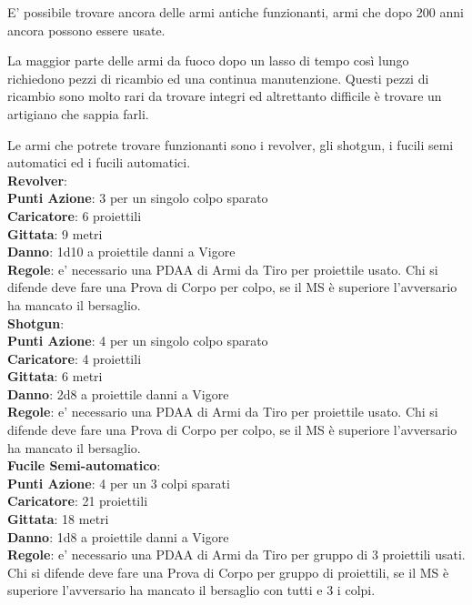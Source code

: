 \documentclass[12pt,a4paper,twoside,openany]{book}
\begin{document}
\begin{multicols}{2}
E' possibile trovare ancora delle armi antiche funzionanti, armi che dopo 200 anni ancora possono essere usate.

La maggior parte delle armi da fuoco dopo un lasso di tempo così lungo richiedono pezzi di ricambio ed una continua manutenzione. Questi pezzi di ricambio sono molto rari da trovare integri ed altrettanto difficile è trovare un artigiano che sappia farli.

Le armi che potrete trovare funzionanti sono i revolver, gli shotgun, i fucili semi automatici ed i fucili automatici.\\

\textbf{Revolver}:\\
\textbf{Punti Azione}: 3 per un singolo colpo sparato\\
\textbf{Caricatore}: 6 proiettili\\
\textbf{Gittata}: 9 metri\\
\textbf{Danno}: 1d10 a proiettile danni a Vigore\\
\textbf{Regole}: e' necessario una PDAA di Armi da Tiro per proiettile usato. Chi si difende deve fare una Prova di Corpo per colpo, se il MS è superiore l'avversario ha mancato il bersaglio.\\

\textbf{Shotgun}:\\
\textbf{Punti Azione}: 4 per un singolo colpo sparato\\
\textbf{Caricatore}: 4 proiettili\\
\textbf{Gittata}: 6 metri\\
\textbf{Danno}: 2d8 a proiettile danni a Vigore\\
\textbf{Regole}: e' necessario una PDAA di Armi da Tiro per proiettile usato. Chi si difende deve fare una Prova di Corpo per colpo, se il MS è superiore l'avversario ha mancato il bersaglio.\\

\textbf{Fucile Semi-automatico}:\\
\textbf{Punti Azione}: 4 per un 3 colpi sparati\\
\textbf{Caricatore}: 21 proiettili\\
\textbf{Gittata}: 18 metri\\
\textbf{Danno}: 1d8 a proiettile danni a Vigore\\
\textbf{Regole}: e' necessario una PDAA di Armi da Tiro per gruppo di 3 proiettili usati. Chi si difende deve fare una Prova di Corpo per gruppo di proiettili, se il MS è superiore l'avversario ha mancato il bersaglio con tutti e 3 i colpi.\\



\end{multicols}
\end{document}
